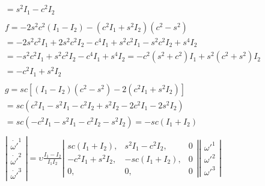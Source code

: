 \documentclass[a4paper,11pt]{article}
\begin{document}
\begin{eqnarray*}
\\
	= s^2 I_1 - c^2 I_2
\\
\\
	f = -2 s^2 c^2 (I_1 - I_2) - (c^2 I_1 + s^2 I_2) (c^2 - s^2) 
\\
	= -2 s^2 c^2 I_1 + 2 s^2 c^2 I_2 - c^4 I_1 + s^2 c^2 I_1 - s^2 c^2 I_2 + s^4 I_2
\\
	= - s^2 c^2 I_1 + s^2 c^2 I_2 - c^4 I_1 + s^4 I_2
	= -c^2 (s^2 + c^2) I_1 + s^2 (c^2 + s^2) I_2
\\
	= -c^2 I_1 + s^2 I_2
\\
\\
	g = s c [(I_1 - I_2) (c^2 - s^2) - 2 (c^2 I_1 + s^2 I_2)]
\\
	= s c (c^2 I_1 - s^2 I_1 - c^2 I_2 + s^2 I_2 - 2 c^2 I_1 - 2 s^2 I_2) 
\\
	= s c (-c^2 I_1 - s^2 I_1 - c^2 I_2 - s^2 I_2)
	= - s c (I_1 + I_2)
\\
\\
	\left|
	\begin{array}{l}
	\dot {\omega '}^1
	\\
	\dot {\omega'}^2
	\\
	\dot {\omega'}^3
	\end{array}
	\right| =
	\upsilon \frac{I_1 - I_2}{I_1 I_2}
	\left|
	\begin{array}{lll}
	s c (I_1 + I_2),		&	s^2 I_1 - c^2 I_2,	&	0
	\\
	-c^2 I_1 + s^2 I_2,	&	-s c (I_1 + I_2),		&	0
	\\
	0,				&	0,				&	0
	\end{array}
	\right|	
	\left|
	\begin{array}{l}
	{\omega '}^1
	\\
	{\omega'}^2
	\\
	{\omega'}^3
	\end{array}
	\right|
\end{eqnarray*}
\end{document}
